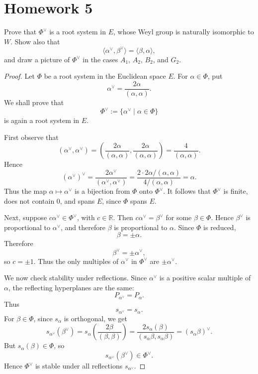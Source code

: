 \section{Homework 5}

\begin{exercise}
    [P46, Ex2] Prove that \(\Phi^\vee\) is a root system in \(E\), whose Weyl group is naturally isomorphic to \(W\). Show also that
    \[
        \langle \alpha^\vee,\beta^\vee\rangle=\langle \beta,\alpha\rangle,
    \]
    and draw a picture of \(\Phi^\vee\) in the cases \(A_1\), \(A_2\), \(B_2\), and \(G_2\).
\end{exercise}

\begin{proof}
    Let \(\Phi\) be a root system in the Euclidean space \(E\). For
    \(\alpha\in \Phi\), put
    \[
        \alpha^\vee=\frac{2\alpha}{(\alpha,\alpha)}.
    \]
    We shall prove that
    \[
        \Phi^\vee:=\{\alpha^\vee\mid \alpha\in\Phi\}
    \]
    is again a root system in \(E\).
    
    First observe that
    \[
        (\alpha^\vee,\alpha^\vee)
        =
        \left(\frac{2\alpha}{(\alpha,\alpha)},
              \frac{2\alpha}{(\alpha,\alpha)}\right)
        =
        \frac{4}{(\alpha,\alpha)}.
    \]
    Hence
    \[
        (\alpha^\vee)^\vee
        =
        \frac{2\alpha^\vee}{(\alpha^\vee,\alpha^\vee)}
        =
        \frac{2\cdot 2\alpha/(\alpha,\alpha)}
             {4/(\alpha,\alpha)}
        =
        \alpha.
    \]
    Thus the map \(\alpha\mapsto \alpha^\vee\) is a bijection from
    \(\Phi\) onto \(\Phi^\vee\). It follows that \(\Phi^\vee\) is finite,
    does not contain \(0\), and spans \(E\), since \(\Phi\) spans \(E\).
    
    Next, suppose \(c\alpha^\vee\in \Phi^\vee\), with \(c\in\mathbb R\).
    Then \(c\alpha^\vee=\beta^\vee\) for some \(\beta\in\Phi\). Hence
    \(\beta^\vee\) is proportional to \(\alpha^\vee\), and therefore \(\beta\)
    is proportional to \(\alpha\). Since \(\Phi\) is reduced,
    \[
        \beta=\pm\alpha.
    \]
    Therefore
    \[
        \beta^\vee=\pm\alpha^\vee,
    \]
    so \(c=\pm 1\). Thus the only multiples of \(\alpha^\vee\) in
    \(\Phi^\vee\) are \(\pm\alpha^\vee\).
    
    We now check stability under reflections. Since \(\alpha^\vee\) is a positive
    scalar multiple of \(\alpha\), the reflecting hyperplanes are the same:
    \[
        P_{\alpha^\vee}=P_\alpha.
    \]
    Thus
    \[
        s_{\alpha^\vee}=s_\alpha.
    \]
    For \(\beta\in\Phi\), since \(s_\alpha\) is orthogonal, we get
    \[
        s_{\alpha^\vee}(\beta^\vee)
        =
        s_\alpha\left(\frac{2\beta}{(\beta,\beta)}\right)
        =
        \frac{2s_\alpha(\beta)}{(s_\alpha\beta,s_\alpha\beta)}
        =
        (s_\alpha\beta)^\vee.
    \]
    But \(s_\alpha(\beta)\in\Phi\), so
    \[
        s_{\alpha^\vee}(\beta^\vee)\in\Phi^\vee.
    \]
    Hence \(\Phi^\vee\) is stable under all reflections \(s_{\alpha^\vee}\).
    

\end{proof}
